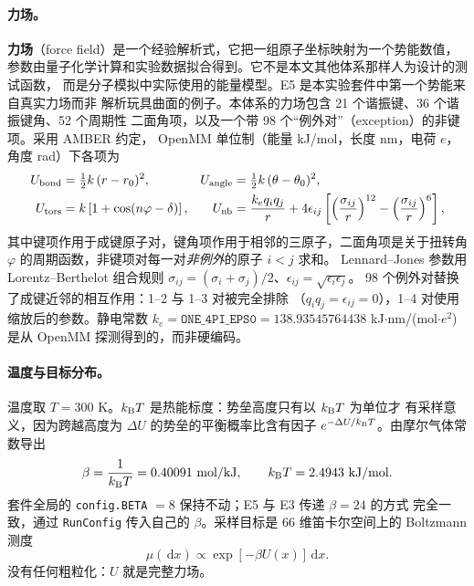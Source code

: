 \documentclass[11pt,a4paper]{article}
\newcommand{\dd}{\,\mathrm{d}}
\begin{document}
\paragraph{力场。}
\textbf{力场}（force field）是一个经验解析式，它把一组原子坐标映射为一个势能数值，
参数由量子化学计算和实验数据拟合得到。它不是本文其他体系那样人为设计的测试函数，
而是分子模拟中实际使用的能量模型。E5 是本实验套件中第一个势能来自真实力场而非
解析玩具曲面的例子。本体系的力场包含 21 个谐振键、36 个谐振键角、52 个周期性
二面角项，以及一个带 98 个“例外对”（exception）的非键项。采用 AMBER 约定，
OpenMM 单位制（能量 kJ/mol，长度 nm，电荷 $e$，角度 rad）下各项为
\begin{align}
 U_{\rm bond}&=\tfrac12 k\,(r-r_0)^2, &
 U_{\rm angle}&=\tfrac12 k\,(\theta-\theta_0)^2,\\
 U_{\rm tors}&=k\left[1+\cos(n\varphi-\delta)\right], &
 U_{\rm nb}&=\frac{k_e q_iq_j}{r}
 +4\epsilon_{ij}\left[\left(\frac{\sigma_{ij}}{r}\right)^{12}
 -\left(\frac{\sigma_{ij}}{r}\right)^{6}\right],
\end{align}
其中键项作用于成键原子对，键角项作用于相邻的三原子，二面角项是关于扭转角
$\varphi$ 的周期函数，非键项对每一对\emph{非例外}的原子 $i<j$ 求和。
Lennard--Jones 参数用 Lorentz--Berthelot 组合规则
$\sigma_{ij}=(\sigma_i+\sigma_j)/2$、$\epsilon_{ij}=\sqrt{\epsilon_i\epsilon_j}$。
98 个例外对替换了成键近邻的相互作用：1--2 与 1--3 对被完全排除
（$q_iq_j=\epsilon_{ij}=0$），1--4 对使用缩放后的参数。静电常数
$k_e=\texttt{ONE\_4PI\_EPS0}=138.93545764438$ kJ$\cdot$nm/(mol$\cdot e^2$)
是从 OpenMM 探测得到的，而非硬编码。

\paragraph{温度与目标分布。}
温度取 $T=300$ K。$k_{\rm B}T$ 是热能标度：势垒高度只有以 $k_{\rm B}T$ 为单位才
有采样意义，因为跨越高度为 $\Delta U$ 的势垒的平衡概率比含有因子
$e^{-\Delta U/k_{\rm B}T}$。由摩尔气体常数导出
\begin{equation}
 \beta=\frac{1}{k_{\rm B}T}=0.40091\ \text{mol/kJ},
 \qquad k_{\rm B}T=2.4943\ \text{kJ/mol}.
\end{equation}
套件全局的 \texttt{config.BETA} $=8$ 保持不动；E5 与 E3 传递 $\beta=24$ 的方式
完全一致，通过 \texttt{RunConfig} 传入自己的 $\beta$。采样目标是 66 维笛卡尔空间上的
Boltzmann 测度
\begin{equation}
 \mu(\dd x)\propto\exp\!\left[-\beta U(x)\right]\dd x .
\end{equation}
没有任何粗粒化：$U$ 就是完整力场。
\end{document}
